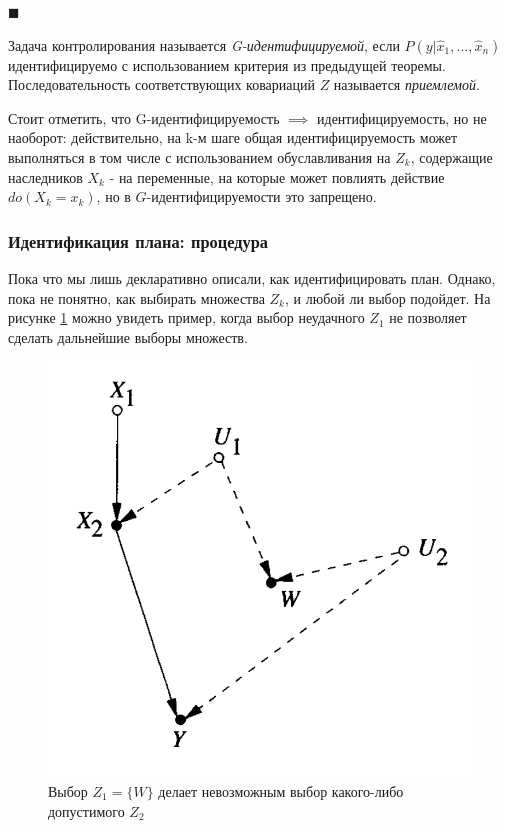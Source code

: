 \documentclass[fleqn]{article}
\numberwithin{equation}{section}
\numberwithin{theorem}{section}
\numberwithin{figure}{section}
\numberwithin{lemma}{section}
\numberwithin{corollary}{section}
\begin{document}
$\blacksquare$

Задача контролирования называется \textit{G-идентифицируемой}, если $P(y|\hat x_1,...,\hat x_n)$ идентифицируемо с использованием критерия из предыдущей теоремы. Последовательность соответствующих ковариаций $Z$ называется \textit{приемлемой}. 

Стоит отметить, что G-идентифицируемость $\implies$ идентифицируемость, но не наоборот: действительно, на k-м шаге общая идентифицируемость может выполняться в том числе с использованием обуславливания  на $Z_k$, содержащие наследников $X_k$ - на переменные, на которые может повлиять действие $do(X_k=x_k)$, но в $G$-идентифицируемости это запрещено.

\subsubsection*{Идентификация плана: процедура}

Пока что мы лишь декларативно описали, как идентифицировать план. Однако, пока не понятно, как выбирать множества $Z_k$, и любой ли выбор подойдет. На рисунке \ref{fig:bad_admissible_set} можно увидеть пример, когда выбор неудачного $Z_1$ не позволяет сделать дальнейшие выборы множеств.

\begin{figure}[h]
\begin{center}
\includegraphics[scale=0.6]{imgs/img27.png}
\end{center}
\caption{Выбор $Z_1=\{W\}$ делает невозможным выбор какого-либо допустимого $Z_2$}
\label{fig:bad_admissible_set}
\end{figure}
 
\end{document}
